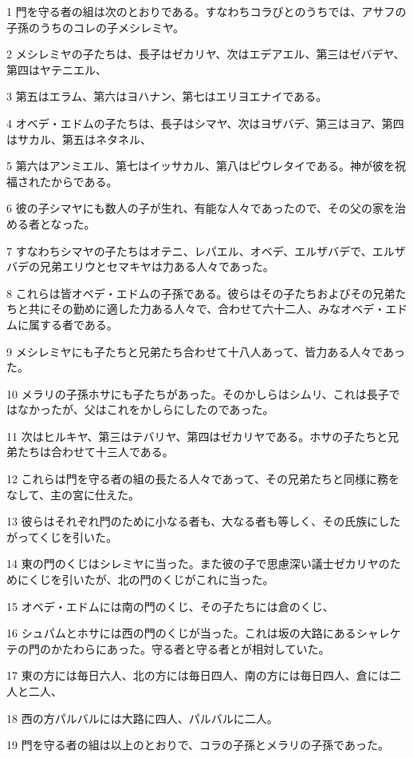 \par 1 門を守る者の組は次のとおりである。すなわちコラびとのうちでは、アサフの子孫のうちのコレの子メシレミヤ。
\par 2 メシレミヤの子たちは、長子はゼカリヤ、次はエデアエル、第三はゼバデヤ、第四はヤテニエル、
\par 3 第五はエラム、第六はヨハナン、第七はエリヨエナイである。
\par 4 オベデ・エドムの子たちは、長子はシマヤ、次はヨザバデ、第三はヨア、第四はサカル、第五はネタネル、
\par 5 第六はアンミエル、第七はイッサカル、第八はピウレタイである。神が彼を祝福されたからである。
\par 6 彼の子シマヤにも数人の子が生れ、有能な人々であったので、その父の家を治める者となった。
\par 7 すなわちシマヤの子たちはオテニ、レパエル、オベデ、エルザバデで、エルザバデの兄弟エリウとセマキヤは力ある人々であった。
\par 8 これらは皆オベデ・エドムの子孫である。彼らはその子たちおよびその兄弟たちと共にその勤めに適した力ある人々で、合わせて六十二人、みなオベデ・エドムに属する者である。
\par 9 メシレミヤにも子たちと兄弟たち合わせて十八人あって、皆力ある人々であった。
\par 10 メラリの子孫ホサにも子たちがあった。そのかしらはシムリ、これは長子ではなかったが、父はこれをかしらにしたのであった。
\par 11 次はヒルキヤ、第三はテバリヤ、第四はゼカリヤである。ホサの子たちと兄弟たちは合わせて十三人である。
\par 12 これらは門を守る者の組の長たる人々であって、その兄弟たちと同様に務をなして、主の宮に仕えた。
\par 13 彼らはそれぞれ門のために小なる者も、大なる者も等しく、その氏族にしたがってくじを引いた。
\par 14 東の門のくじはシレミヤに当った。また彼の子で思慮深い議士ゼカリヤのためにくじを引いたが、北の門のくじがこれに当った。
\par 15 オベデ・エドムには南の門のくじ、その子たちには倉のくじ、
\par 16 シュパムとホサには西の門のくじが当った。これは坂の大路にあるシャレケテの門のかたわらにあった。守る者と守る者とが相対していた。
\par 17 東の方には毎日六人、北の方には毎日四人、南の方には毎日四人、倉には二人と二人、
\par 18 西の方パルバルには大路に四人、パルバルに二人。
\par 19 門を守る者の組は以上のとおりで、コラの子孫とメラリの子孫であった。
